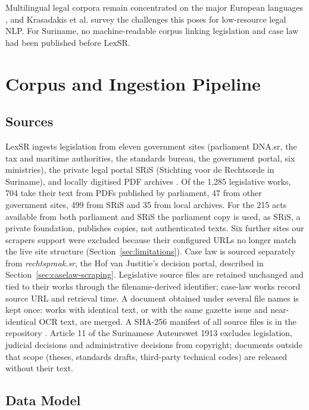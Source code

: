 \documentclass{IOS-Book-Article}
\begin{document}
Multilingual legal corpora remain concentrated on the major European languages
\cite{niklaus2024}, and Krasadakis et al. \cite{krasadakis2024} survey the challenges
this poses for low-resource legal NLP. For Suriname, no machine-readable corpus linking
legislation and case law had been published before LexSR.

\section{Corpus and Ingestion Pipeline}
\label{sec:corpus}

\subsection{Sources}

LexSR ingests legislation from eleven government sites (parliament DNA.sr, the tax and
maritime authorities, the standards bureau, the government portal, six ministries), the
private legal portal SRiS (Stichting voor de Rechtsorde in Suriname), and locally digitised
PDF archives \cite{sources}. Of the 1,285 legislative works, 704 take their text from PDFs
published by parliament, 47 from other government sites, 499 from SRiS and 35 from local
archives. For the 215 acts available from both parliament and SRiS the parliament copy is
used, as SRiS, a private foundation, publishes copies, not authenticated texts. Six further
sites our scrapers support were excluded because their configured URLs no longer match the
live site structure (Section~\ref{sec:limitations}). Case law is sourced separately from
\emph{rechtspraak.sr}, the Hof van Justitie's decision portal, described in Section~\ref{sec:caselaw-scraping}. Legislative
source files are retained unchanged and tied to their works through the filename-derived
identifier; case-law works record source URL and retrieval time. A document obtained under
several file names is kept once: works with identical text, or with the same gazette issue
and near-identical OCR text, are merged. A SHA-256 manifest of
all source files is in the repository \cite{repo}. Article 11 of the Surinamese Auteurswet 1913
excludes legislation, judicial decisions and administrative decisions from copyright;
documents outside that scope (theses, standards drafts, third-party technical codes)
are released without their text.

\subsection{Data Model}
\end{document}
